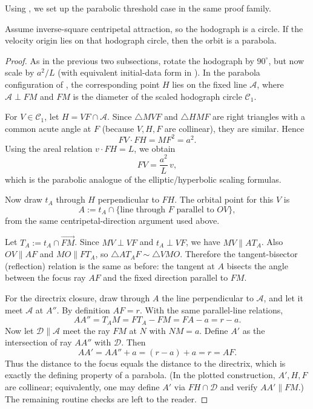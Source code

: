 Using , we set up the parabolic threshold case in the same proof family.

\begin{proposition}
Assume inverse-square centripetal attraction, so the hodograph is a circle. If the velocity origin lies on that hodograph circle, then the orbit is a parabola.
\end{proposition}

\begin{proof}
As in the previous two subsections, rotate the hodograph by \(90^\circ\), but now scale by \(a^2/L\) (with equivalent initial-data form in ). In the parabola configuration of , the corresponding point \(H\) lies on the fixed line \(\mathcal A\), where \(\mathcal A\perp FM\) and \(FM\) is the diameter of the scaled hodograph circle \(\mathcal C_1\).

For \(V\in\mathcal C_1\), let \(H=VF\cap\mathcal A\). Since \(\triangle MVF\) and \(\triangle HMF\) are right triangles with a common acute angle at \(F\) (because \(V,H,F\) are collinear), they are similar. Hence
\[
  FV\cdot FH=MF^2=a^2.
\]
Using the areal relation \(v\cdot FH=L\), we obtain
\[
  FV=\frac{a^2}{L}\,v,
\]
which is the parabolic analogue of the elliptic/hyperbolic scaling formulas.

Now draw \(t_A\) through \(H\) perpendicular to \(FH\). The orbital point for this \(V\) is
\[
  A:=t_A\cap\{\text{line through }F\text{ parallel to }OV\},
\]
from the same centripetal-direction argument used above.

Let \(T_A:=t_A\cap \overrightarrow{FM}\). Since \(MV\perp VF\) and \(t_A\perp VF\), we have \(MV\parallel AT_A\). Also \(OV\parallel AF\) and \(MO\parallel FT_A\), so \(\triangle A T_A F\sim\triangle VMO\). Therefore the tangent-bisector (reflection) relation is the same as before: the tangent at \(A\) bisects the angle between the focus ray \(AF\) and the fixed direction parallel to \(FM\).

For the directrix closure, draw through \(A\) the line perpendicular to \(\mathcal A\), and let it meet \(\mathcal A\) at \(A''\). By definition \(AF=r\). With the same parallel-line relations,
\[
  AA''=T_A M=F T_A-F M=F A-a=r-a.
\]
Now let \(\mathcal D\parallel\mathcal A\) meet the ray \(FM\) at \(N\) with \(NM=a\). Define \(A'\) as the intersection of ray \(AA''\) with \(\mathcal D\). Then
\[
  AA'=AA''+a=(r-a)+a=r=AF.
\]
Thus the distance to the focus equals the distance to the directrix, which is exactly the defining property of a parabola. (In the plotted construction, \(A',H,F\) are collinear; equivalently, one may define \(A'\) via \(FH\cap\mathcal D\) and verify \(AA'\parallel FM\).) The remaining routine checks are left to the reader.
\end{proof}

